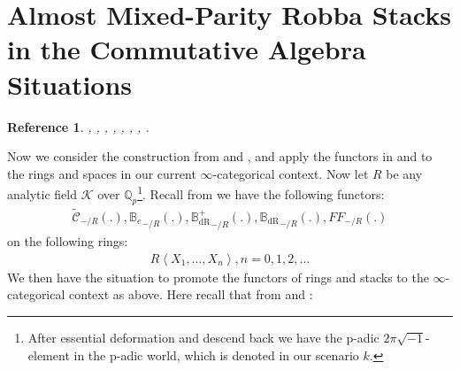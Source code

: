 \documentclass[12pt]{book}
\newtheorem{reference}{Reference}
\begin{document}
\newpage
\section{Almost Mixed-Parity Robba Stacks in the Commutative Algebra Situations}

\begin{reference}
\cite{KL1}, \cite{KL2}, \cite{Sch1}, \cite{Sch}, \cite{Fon}, \cite{FF}, \cite{F1}, \cite{Ta}.
\end{reference}




Now we consider the construction from \cite{KL1} and \cite{KL2}, and apply the functors in \cite[Definition 9.3.3, Definition 9.3.5, Definition 9.3.11, Definition 9.3.9]{KL1} and \cite{KL2} to the rings and spaces in our current $\infty$-categorical context. Now let $R$ be any analytic field $\mathcal{K}$ over $\mathbb{Q}_p$\footnote{After essential deformation and descend back we have the p-adic $2\pi\sqrt{-1}$-element in the p-adic world, which is denoted in our scenario $k$.}. Recall from \cite[Definition 9.3.3, Definition 9.3.5, Definition 9.3.11, Definition 9.3.9]{KL1} we have the following functors:
\begin{align}
\widetilde{\mathcal{C}}_{-/R}(.),{\mathbb{B}_e}_{-/R}(.),{\mathbb{B}_\mathrm{dR}^+}_{-/R}(.),{\mathbb{B}_\mathrm{dR}}_{-/R}(.),{FF}_{-/R}(.)	
\end{align}
on the following rings:
\begin{align}
R\left<X_1,...,X_n\right>,n=0,1,2,...	
\end{align}
We then have the situation to promote the functors of rings and stacks to the $\infty$-categorical context as above. Here recall that from \cite[Definition 9.3.3, Definition 9.3.5, Definition 9.3.11, Definition 9.3.9]{KL1} and \cite{KL2}:
\end{document}
